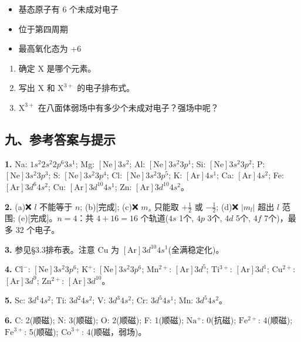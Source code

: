 \begin{enumerate}
  \begin{itemize}
  \tightlist
  \item
    基态原子有 6 个未成对电子
  \item
    位于第四周期
  \item
    最高氧化态为 +6
  \end{itemize}

  \begin{enumerate}
  \def\labelenumii{(\alph{enumii})}
  \tightlist
  \item
    确定 X 是哪个元素。
  \item
    写出 \(\mathrm{X}\) 和 \(\mathrm{X^{3+}}\) 的电子排布式。
  \item
    \(\mathrm{X^{3+}}\) 在八面体弱场中有多少个未成对电子？强场中呢？
  \end{enumerate}
\end{enumerate}

\subsection{九、参考答案与提示}\label{ux4e5dux53c2ux8003ux7b54ux6848ux4e0eux63d0ux793a}

\textbf{1.} Na: \(1s^2 2s^2 2p^6 3s^1\); Mg: \([\mathrm{Ne}]3s^2\); Al: \([\mathrm{Ne}]3s^2 3p^1\); Si: \([\mathrm{Ne}]3s^2 3p^2\); P: \([\mathrm{Ne}]3s^2 3p^3\); S: \([\mathrm{Ne}]3s^2 3p^4\); Cl: \([\mathrm{Ne}]3s^2 3p^5\); K: \([\mathrm{Ar}]4s^1\); Ca: \([\mathrm{Ar}]4s^2\); Fe: \([\mathrm{Ar}]3d^6 4s^2\); Cu: \([\mathrm{Ar}]3d^{10} 4s^1\); Zn: \([\mathrm{Ar}]3d^{10} 4s^2\)。

\textbf{2.} (a)❌ \(l\) 不能等于 \(n\); (b){[}完成{]}; (c)❌ \(m_s\) 只能取 \(+\frac{1}{2}\) 或 \(-\frac{1}{2}\); (d)❌ \(|m_l|\) 超出 \(l\) 范围; (e){[}完成{]}。\(n=4\)：共 \(4+16=16\) 个轨道(\(4s\) 1个, \(4p\) 3个, \(4d\) 5个, \(4f\) 7个)，最多 32 个电子。

\textbf{3.} 参见§3.3排布表。注意 Cu 为 \([\mathrm{Ar}]3d^{10}4s^1\)(全满稳定化)。

\textbf{4.} \(\mathrm{Cl^-}\): \([\mathrm{Ne}]3s^2 3p^6\); \(\mathrm{K^+}\): \([\mathrm{Ne}]3s^2 3p^6\); \(\mathrm{Mn^{2+}}\): \([\mathrm{Ar}]3d^5\); \(\mathrm{Ti^{3+}}\): \([\mathrm{Ar}]3d^1\); \(\mathrm{Cu^{2+}}\): \([\mathrm{Ar}]3d^9\); \(\mathrm{Zn^{2+}}\): \([\mathrm{Ar}]3d^{10}\)。

\textbf{5.} Sc: \(3d^1 4s^2\); Ti: \(3d^2 4s^2\); V: \(3d^3 4s^2\); Cr: \(3d^5 4s^1\); Mn: \(3d^5 4s^2\)。

\textbf{6.} C: 2(顺磁); N: 3(顺磁); O: 2(顺磁); F: 1(顺磁); \(\mathrm{Na^+}\): 0(抗磁); \(\mathrm{Fe^{2+}}\): 4(顺磁); \(\mathrm{Fe^{3+}}\): 5(顺磁); \(\mathrm{Co^{3+}}\): 4(顺磁，弱场)。


